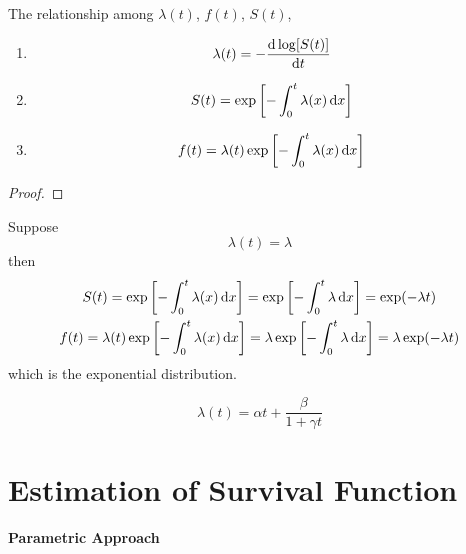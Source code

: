 \begin{property}
	The relationship among \(\lambda(t)\), \(f(t)\), \(S(t)\),
	\begin{enumerate}
		\item
		      \begin{equation}
			      \lambda(t)=-\frac{\mathop{}\!\mathrm{d}\log [S(t)]}{\mathop{}\!\mathrm{d} t}
		      \end{equation}
		\item
		      \begin{equation}
			      S(t)=\exp\left[-\int_{0}^{t}\lambda(x)\mathop{}\!\mathrm{d} x\right]
		      \end{equation}
		\item
		      \begin{equation}
			      f(t)=\lambda(t)\exp\left[-\int_{0}^{t}\lambda(x)\mathop{}\!\mathrm{d} x\right]
		      \end{equation}
	\end{enumerate}
\end{property}

\begin{proof}

\end{proof}

\begin{example}
	Suppose
	\begin{equation}
		\lambda(t)=\lambda
	\end{equation}
	then
	\begin{gather*}
		S(t)=\exp\left[-\int_{0}^{t}\lambda(x)\mathop{}\!\mathrm{d} x\right]=\exp\left[-\int_{0}^{t}\lambda\mathop{}\!\mathrm{d} x\right]=\exp(-\lambda t) \\
		f(t)=\lambda(t)\exp\left[-\int_{0}^{t}\lambda(x)\mathop{}\!\mathrm{d} x\right]=\lambda\exp\left[-\int_{0}^{t}\lambda\mathop{}\!\mathrm{d} x\right]=\lambda\exp(-\lambda t)
	\end{gather*}
	which is the exponential distribution.
\end{example}

\begin{example}
	\begin{equation}
		\lambda(t)=\alpha t+\frac{\beta}{1+\gamma t}
	\end{equation}
\end{example}

\section{Estimation of Survival Function}

\paragraph*{Parametric Approach}

